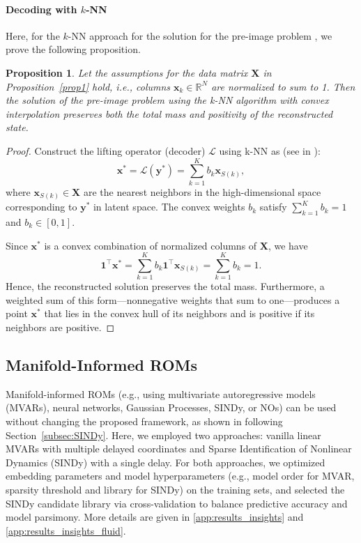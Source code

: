 \documentclass{article}
\newtheorem{prop}{Proposition}
\begin{document}
\paragraph{Decoding with $k$-NN}
Here, for the $k$-NN approach for the solution for the pre-image problem \cite{chin2024enabling}, we prove the following proposition.
\begin{prop}
Let the assumptions for the data matrix $\mathbf{X}$ in Proposition~\ref{prop1} hold, i.e., columns $\mathbf{x}_k \in \mathbb{R}^N$ are normalized to sum to 1. Then the solution of the pre-image problem using the k-NN algorithm with convex interpolation preserves both the total mass and positivity of the reconstructed state.
\end{prop}

\begin{proof}
Construct the lifting operator (decoder) $\mathcal{L}$ using k-NN as (see in \cite{chin2024enabling}):
\begin{equation}
    \mathbf{x}^* = \mathcal{L}(\mathbf{y}^*) = \sum_{k=1}^K b_k \mathbf{x}_{S(k)},
\end{equation}
where $\mathbf{x}_{S(k)} \in \mathbf{X}$ are the nearest neighbors in the high-dimensional space corresponding to $\mathbf{y}^*$ in latent space. The convex weights $b_k$ satisfy $\sum_{k=1}^K b_k = 1$ and $b_k \in [0,1]$.  

Since $\mathbf{x}^*$ is a convex combination of normalized columns of $\mathbf{X}$, we have
\begin{equation}
    \mathbf{1}^\top \mathbf{x}^* = \sum_{k=1}^K b_k \mathbf{1}^\top \mathbf{x}_{S(k)} = \sum_{k=1}^K b_k = 1.
\end{equation}
Hence, the reconstructed solution preserves the total mass. Furthermore, a weighted sum of this form—nonnegative weights that sum to one—produces a point $\mathbf{x}^*$ that lies in the convex hull of its neighbors and is positive if its neighbors are positive.
\end{proof}

\subsection{Manifold-Informed ROMs}
Manifold-informed ROMs (e.g., using multivariate autoregressive models (MVARs), neural networks, Gaussian Processes, SINDy, or NOs) can be used without changing the proposed framework, as shown in following Section~\ref{subsec:SINDy}.
Here, we employed two approaches: vanilla linear MVARs with multiple delayed coordinates and Sparse Identification of Nonlinear Dynamics (SINDy) \cite{brunton2016discovering,Rudy2017} with a single delay. For both approaches, we optimized embedding parameters and model hyperparameters (e.g., model order for MVAR,  sparsity threshold and library for SINDy) on the training sets, and selected the SINDy candidate library via cross-validation to balance predictive accuracy and model parsimony. More details are given in \ref{app:results_insights} and \ref{app:results_insights_fluid}.
\end{document}
